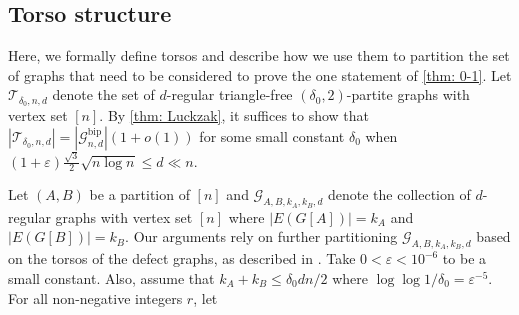 \documentclass[11pt]{article}
\newcommand{\jca}[1]{{\color{OliveGreen}[Jane May 17: #1]}}
\theoremstyle{plain}
\begin{document}


\subsection{Torso structure}\label{sub: Torso}
Here, we formally define torsos and describe how we use them to partition the set of graphs that need to be considered to prove the one statement of \cref{thm: 0-1}. Let $\mathcal T_{\delta_0,n,d}$ denote the set of $d$-regular triangle-free $(\delta_0,2)$-partite graphs with vertex set $[n]$.
By \cref{thm: Luckzak}, it suffices to show that $|\mathcal T_{\delta_0, n,d}| = |\mathcal G_{n,d}^\text{bip}|(1 + o(1))$  for some small constant $\delta_0$ when $(1 + \varepsilon)\frac{\sqrt 3}{2}\sqrt{n \log n} \leq d \ll n$. 



Let $(A,B)$ be a partition of $[n]$ and $\mathcal G_{A, B, k_A, k_B, d}$ denote the collection of $d$-regular graphs with vertex set $[n]$ where $|E(G[A])| = k_A$ and $|E(G[B])| = k_B$. Our arguments rely on further partitioning $\mathcal G_{A,B,k_A,k_B,d}$ based on the torsos of the defect graphs, as described in \cite{osthus2003densities}. Take $0 < \varepsilon < 10^{-6}$ to be a small constant. Also, assume that $k_A + k_B \leq \delta_0 dn/2$ where $\log\log 1/\delta_0 = \varepsilon ^{-5}$. For all non-negative integers $r$, let 
\end{document}
